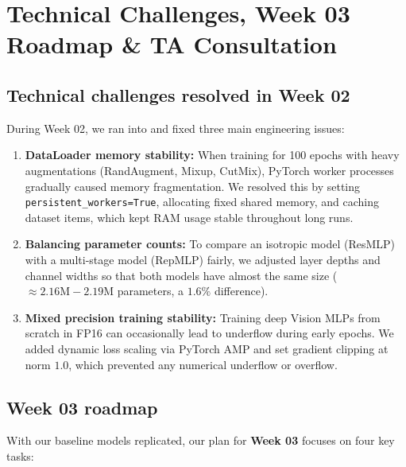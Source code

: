 \section{Technical Challenges, Week 03 Roadmap \& TA Consultation}
\label{sec:challenges_and_roadmap}

\subsection{Technical challenges resolved in Week 02}
During Week 02, we ran into and fixed three main engineering issues:
\begin{enumerate}[label=\textbf{\arabic*.}]
    \item \textbf{DataLoader memory stability:} When training for 100 epochs with heavy augmentations (RandAugment, Mixup, CutMix), PyTorch worker processes gradually caused memory fragmentation. We resolved this by setting \texttt{persistent\_workers=True}, allocating fixed shared memory, and caching dataset items, which kept RAM usage stable throughout long runs.
    \item \textbf{Balancing parameter counts:} To compare an isotropic model (ResMLP) with a multi-stage model (RepMLP) fairly, we adjusted layer depths and channel widths so that both models have almost the same size ($\approx 2.16\text{M} - 2.19\text{M}$ parameters, a $1.6\%$ difference).
    \item \textbf{Mixed precision training stability:} Training deep Vision MLPs from scratch in FP16 can occasionally lead to underflow during early epochs. We added dynamic loss scaling via PyTorch AMP and set gradient clipping at norm $1.0$, which prevented any numerical underflow or overflow.
\end{enumerate}

\subsection{Week 03 roadmap}
With our baseline models replicated, our plan for \textbf{Week 03} focuses on four key tasks:

